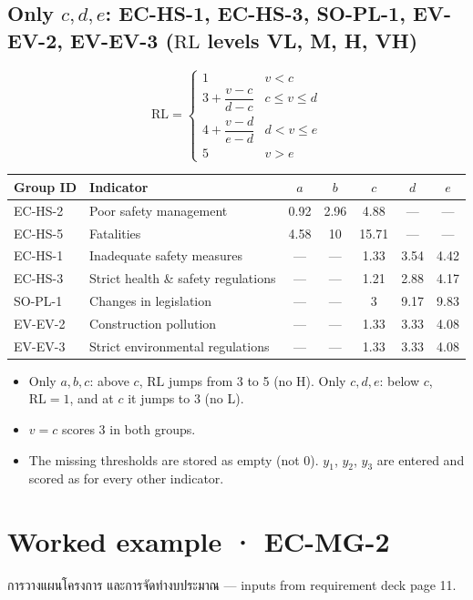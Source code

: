 \documentclass[10pt,a4paper]{article}
\newcommand{\RL}{\mathrm{RL}}\newcommand{\RIC}{\mathrm{RI_C}}\newcommand{\RIT}{\mathrm{RI_T}}\newcommand{\RIE}{\mathrm{RI_E}}
\begin{document}
\subsection*{Only $c,d,e$: EC-HS-1, EC-HS-3, SO-PL-1, EV-EV-2, EV-EV-3 \quad ($\RL$ levels VL, M, H, VH)}
\[
\RL=\begin{cases}
1 & v<c\\[2pt]
3+\dfrac{v-c}{d-c} & c\le v\le d\\[8pt]
4+\dfrac{v-d}{e-d} & d<v\le e\\[8pt]
5 & v>e
\end{cases}
\]
\begin{center}\small
\begin{tabular}{@{}l l ccccc@{}}
\toprule
Group ID & Indicator & $a$ & $b$ & $c$ & $d$ & $e$\\\midrule
EC-HS-2 & Poor safety management & 0.92 & 2.96 & 4.88 & --- & ---\\
EC-HS-5 & Fatalities & 4.58 & 10 & 15.71 & --- & ---\\\midrule
EC-HS-1 & Inadequate safety measures & --- & --- & 1.33 & 3.54 & 4.42\\
EC-HS-3 & Strict health \& safety regulations & --- & --- & 1.21 & 2.88 & 4.17\\
SO-PL-1 & Changes in legislation & --- & --- & 3 & 9.17 & 9.83\\
EV-EV-2 & Construction pollution & --- & --- & 1.33 & 3.33 & 4.08\\
EV-EV-3 & Strict environmental regulations & --- & --- & 1.33 & 3.33 & 4.08\\
\bottomrule
\end{tabular}
\end{center}
\begin{itemize}[leftmargin=1.4em,labelwidth=1em,align=left]
\item[•] Only $a,b,c$: above $c$, $\RL$ jumps from 3 to 5 (no H). Only $c,d,e$: below $c$, $\RL=1$, and at $c$ it jumps to 3 (no L).
\item[•] $v=c$ scores 3 in both groups.
\item[•] The missing thresholds are stored as empty (not 0). $y_1$, $y_2$, $y_3$ are entered and scored as for every other indicator.
\end{itemize}

\section{Worked example · EC-MG-2}\label{sec:ex}
การวางแผนโครงการ และการจัดทำงบประมาณ — inputs from requirement deck page 11.
\end{document}
